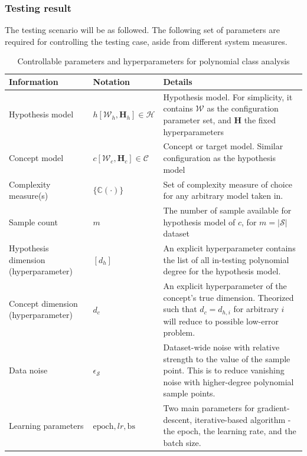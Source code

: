 \documentclass[10pt]{article} %
\begin{document}
\subsubsection{Testing result}
The testing scenario will be as followed. The following set of parameters are required for controlling the testing case, aside from different system measures. 

\begin{table}[htb]
  \centering
  \footnotesize
  \begin{threeparttable}
    \caption{Controllable parameters and hyperparameters for polynomial class analysis}
    \label{tab:polynomial_test}
    \begin{tabularx}{\textwidth}{@{} L{0.25\textwidth}
                                     L{0.2\textwidth}
                                     >{\RaggedRight\arraybackslash}X @{}}
      \toprule
      \textbf{Information} & \textbf{Notation} & \textbf{Details} \\
      \midrule
      Hypothesis model
        & $h[\mathcal{W}_{h},\mathbf{H}_{h}]\in \mathcal{H}$
        & Hypothesis model. For simplicity, it contains $\mathcal{W}$ as the configuration parameter set, and $\mathbf{H}$ the fixed hyperparameters \\
      \addlinespace[1pt]
      Concept model
        & $c[\mathcal{W}_{c},\mathbf{H}_{c}]\in \mathcal{C}$
        & Concept or target model. Similar configuration as the hypothesis model \\
      \addlinespace[1pt]
      Complexity measure(s)
        & $\{\mathbb{C}(\cdot)\}$
        & Set of complexity measure of choice for any arbitrary model taken in. \\
      \addlinespace[1pt]
      Sample count
        & $m$
        & The number of sample available for hypothesis model of $c$, for $m=|\mathcal{S}|$ dataset\\
      \addlinespace[1pt]
      Hypothesis dimension (hyperparameter)
        & $[d_{h}]$
        & An explicit hyperparameter contains the list of all in-testing polynomial degree for the hypothesis model. \\
      \addlinespace[1pt]
      Concept dimension (hyperparameter)
        & $d_{c}$
        & An explicit hyperparameter of the concept's true dimension. Theorized such that $d_{c}=d_{h,i}$ for arbitrary $i$ will reduce to possible low-error problem.\\
      \addlinespace[1pt]
      Data noise
        & $\epsilon_{\mathcal{S}}$
        & Dataset-wide noise with relative strength to the value of the sample point. This is to reduce vanishing noise with higher-degree polynomial sample points. \\
      \addlinespace[1pt]
      Learning parameters
        & $\mathrm{epoch}, lr, \mathrm{bs}$
        & Two main parameters for gradient-descent, iterative-based algorithm - the epoch, the learning rate, and the batch size.\\
      \bottomrule
    \end{tabularx}


\end{threeparttable}
\end{table}
\end{document}
